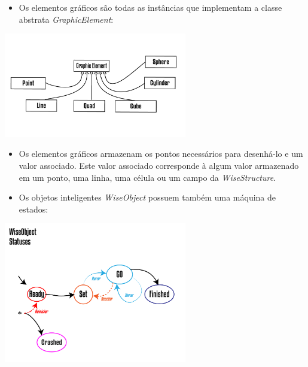 \documentclass[10pt]{beamer}
\theoremstyle{remark}
\theoremstyle{definition}
\begin{document}
\begin{frame}[allowframebreaks]
\begin{center}
		\end{center}
		
		\framebreak
		\begin{itemize}
				\item Os elementos gráficos são todas as instâncias que implementam a classe abstrata \textit{GraphicElement}:
		\end{itemize}		
		
		\begin{center}
			
			\item \includegraphics[width=0.6\textwidth]{images/GraphicElements.png}
			
		\end{center}
		
		\begin{itemize}
			\item Os elementos gráficos armazenam os pontos necessários para desenhá-lo e um valor associado. Este valor associado corresponde à algum valor armazenado em um ponto, uma linha, uma célula ou um campo da \textit{WiseStructure}.
		\end{itemize}
		
		\framebreak
	
		\begin{itemize}
				\item Os objetos inteligentes \textit{WiseObject} possuem também uma máquina de estados:
		\end{itemize}		
		
		\begin{center}
			
			\item \includegraphics[width=0.6\textwidth]{images/WiseObjectStatus.png}
			

\end{center}
\end{frame}
\end{document}
